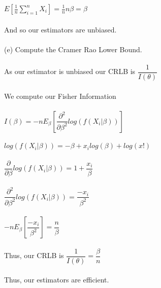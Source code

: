 \documentclass{article}
\begin{document}
$E[\frac{1}{n}\sum_{i=1}^nX_i]=\frac{1}{n}n\beta=\beta$\\\\
And so our estimators are unbiased.\\\\
(e) Compute the Cramer Rao Lower Bound.\\\\
As our estimator is unbiased our CRLB is $\dfrac{1}{I(\theta)}$\\\\
We compute our Fisher Information\\\\
$I(\beta)=-nE_\beta[\dfrac{\partial^2}{\partial\beta^2}log(f(X_i|\beta))]$\\\\
$log(f(X_i|\beta))=-\beta+x_ilog(\beta)+log(x!)$\\\\
$\dfrac{\partial}{\partial\beta}log(f(X_i|\beta))=1+\dfrac{x_i}{\beta}$\\\\
$\dfrac{\partial^2}{\partial\beta^2}log(f(X_i|\beta))=\dfrac{-x_i}{\beta^2}$\\\\
$-nE_\beta[\dfrac{-x_i}{\beta^2}]=\dfrac{n}{\beta}$\\\\
Thus, our CRLB is $\dfrac{1}{I(\theta)}=\dfrac{\beta}{n}$\\\\
Thus, our estimators are efficient.
\pagebreak
\end{document}
